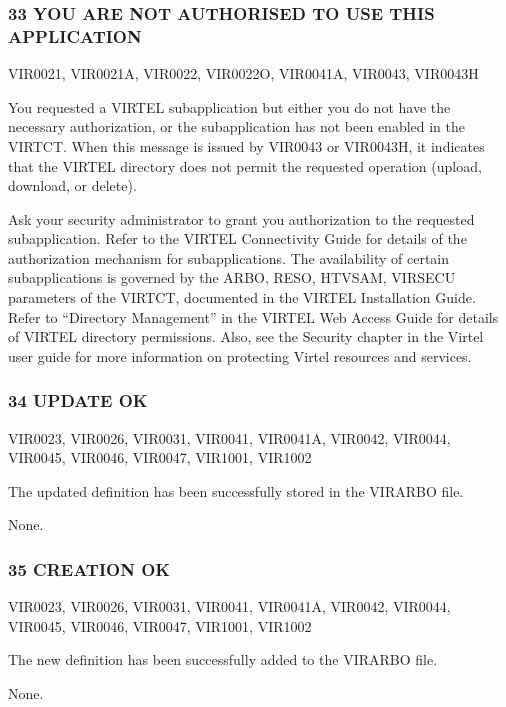 \documentclass[letterpaper,10pt,english]{sphinxmanual}
\begin{document}
\subsubsection{33 YOU ARE NOT AUTHORISED TO USE THIS APPLICATION}
\label{\detokenize{messages:you-are-not-authorised-to-use-this-application}}\begin{description}
\sphinxAtStartPar
VIR0021, VIR0021A, VIR0022, VIR0022O, VIR0041A, VIR0043, VIR0043H

\sphinxAtStartPar
You requested a VIRTEL subapplication but either you do not have the necessary authorization, or the subapplication has not been enabled in the VIRTCT. When this message is issued by VIR0043 or VIR0043H, it indicates that the VIRTEL directory does not permit the requested operation (upload, download, or delete).

\sphinxAtStartPar
Ask your security administrator to grant you authorization to the requested subapplication. Refer to the VIRTEL Connectivity Guide for details of the authorization mechanism for subapplications. The availability of certain subapplications is governed by the ARBO, RESO, HTVSAM, VIRSECU parameters of the VIRTCT, documented in the VIRTEL Installation Guide. Refer to “Directory Management” in the VIRTEL Web Access Guide for details of VIRTEL directory permissions. Also, see the Security chapter in the Virtel user guide for more information on protecting Virtel resources and services.

\end{description}


\subsubsection{34 UPDATE OK}
\label{\detokenize{messages:update-ok}}\begin{description}
\sphinxAtStartPar
VIR0023, VIR0026, VIR0031, VIR0041, VIR0041A, VIR0042, VIR0044, VIR0045, VIR0046, VIR0047, VIR1001, VIR1002

\sphinxAtStartPar
The updated definition has been successfully stored in the VIRARBO file.

\sphinxAtStartPar
None.

\end{description}


\subsubsection{35 CREATION OK}
\label{\detokenize{messages:creation-ok}}\begin{description}
\sphinxAtStartPar
VIR0023, VIR0026, VIR0031, VIR0041, VIR0041A, VIR0042, VIR0044, VIR0045, VIR0046, VIR0047, VIR1001, VIR1002

\sphinxAtStartPar
The new definition has been successfully added to the VIRARBO file.

\sphinxAtStartPar
None.

\end{description}
\end{document}
